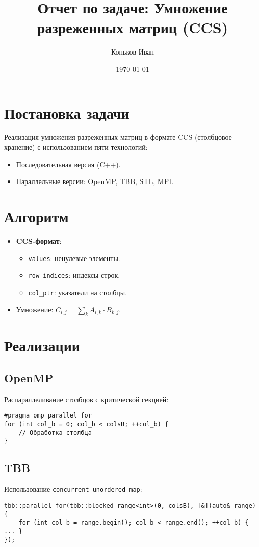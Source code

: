 \documentclass[12pt]{article}
\title{Отчет по задаче: Умножение разреженных матриц (CCS)}
\author{Коньков Иван}
\date{\today}
\begin{document}
\maketitle

\section{Постановка задачи}
Реализация умножения разреженных матриц в формате CCS (столбцовое хранение) с использованием пяти технологий:
\begin{itemize}
    \item Последовательная версия (C++).
    \item Параллельные версии: OpenMP, TBB, STL, MPI.
\end{itemize}

\section{Алгоритм}
\begin{itemize}
    \item \textbf{CCS-формат}: 
        \begin{itemize}
            \item \texttt{values}: ненулевые элементы.
            \item \texttt{row\_indices}: индексы строк.
            \item \texttt{col\_ptr}: указатели на столбцы.
        \end{itemize}
    \item Умножение: \( C_{i,j} = \sum_{k} A_{i,k} \cdot B_{k,j} \).
\end{itemize}

\section{Реализации}
\subsection*{OpenMP}
Распараллеливание столбцов с критической секцией:
\begin{lstlisting}
#pragma omp parallel for
for (int col_b = 0; col_b < colsB; ++col_b) {
    // Обработка столбца
}
\end{lstlisting}

\subsection*{TBB}
Использование \texttt{concurrent\_unordered\_map}:
\begin{lstlisting}
tbb::parallel_for(tbb::blocked_range<int>(0, colsB), [&](auto& range) {
    for (int col_b = range.begin(); col_b < range.end(); ++col_b) { ... }
});
\end{lstlisting}
\end{document}
